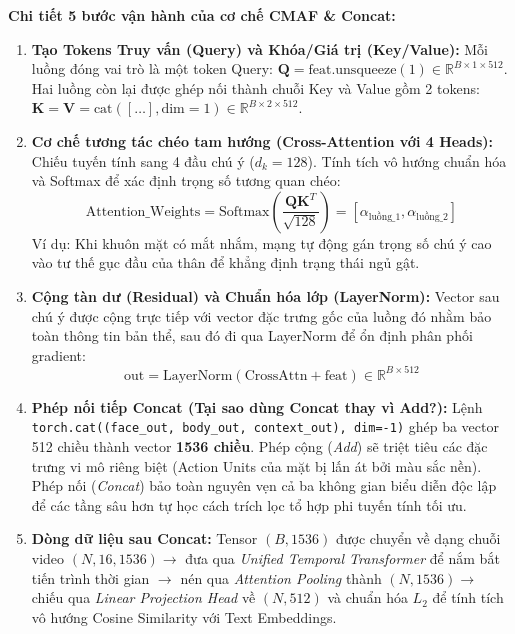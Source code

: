 \documentclass[10pt,a4paper]{article}
\begin{document}
\noindent\textbf{Chi tiết 5 bước vận hành của cơ chế CMAF \& Concat:}
\begin{enumerate}[leftmargin=18pt, itemsep=2pt]
    \item \textbf{Tạo Tokens Truy vấn (Query) và Khóa/Giá trị (Key/Value):} Mỗi luồng đóng vai trò là một token Query: $\bm{Q} = \text{feat}.\text{unsqueeze}(1) \in \mathbb{R}^{B \times 1 \times 512}$. Hai luồng còn lại được ghép nối thành chuỗi Key và Value gồm 2 tokens: $\bm{K} = \bm{V} = \text{cat}([\dots], \text{dim}=1) \in \mathbb{R}^{B \times 2 \times 512}$.
    \item \textbf{Cơ chế tương tác chéo tam hướng (Cross-Attention với 4 Heads):} Chiếu tuyến tính sang 4 đầu chú ý ($d_k = 128$). Tính tích vô hướng chuẩn hóa và Softmax để xác định trọng số tương quan chéo:
    \begin{equation}
        \text{Attention\_Weights} = \text{Softmax}\left(\frac{\bm{Q}\bm{K}^T}{\sqrt{128}}\right) = [\alpha_{\text{luồng\_1}}, \alpha_{\text{luồng\_2}}]
    \end{equation}
    Ví dụ: Khi khuôn mặt có mắt nhắm, mạng tự động gán trọng số chú ý cao vào tư thế gục đầu của thân để khẳng định trạng thái ngủ gật.
    \item \textbf{Cộng tàn dư (Residual) và Chuẩn hóa lớp (LayerNorm):} Vector sau chú ý được cộng trực tiếp với vector đặc trưng gốc của luồng đó nhằm bảo toàn thông tin bản thể, sau đó đi qua LayerNorm để ổn định phân phối gradient:
    \begin{equation}
        \text{out} = \text{LayerNorm}(\text{CrossAttn} + \text{feat}) \in \mathbb{R}^{B \times 512}
    \end{equation}
    \item \textbf{Phép nối tiếp Concat (Tại sao dùng Concat thay vì Add?):} Lệnh \texttt{torch.cat((face\_out, body\_out, context\_out), dim=-1)} ghép ba vector 512 chiều thành vector \textbf{1536 chiều}. Phép cộng (\textit{Add}) sẽ triệt tiêu các đặc trưng vi mô riêng biệt (Action Units của mặt bị lấn át bởi màu sắc nền). Phép nối (\textit{Concat}) bảo toàn nguyên vẹn cả ba không gian biểu diễn độc lập để các tầng sâu hơn tự học cách trích lọc tổ hợp phi tuyến tính tối ưu.
    \item \textbf{Dòng dữ liệu sau Concat:} Tensor $(B, 1536)$ được chuyển về dạng chuỗi video $(N, 16, 1536) \rightarrow$ đưa qua \textit{Unified Temporal Transformer} để nắm bắt tiến trình thời gian $\rightarrow$ nén qua \textit{Attention Pooling} thành $(N, 1536) \rightarrow$ chiếu qua \textit{Linear Projection Head} về $(N, 512)$ và chuẩn hóa $L_2$ để tính tích vô hướng Cosine Similarity với Text Embeddings.
\end{enumerate}
\end{document}
